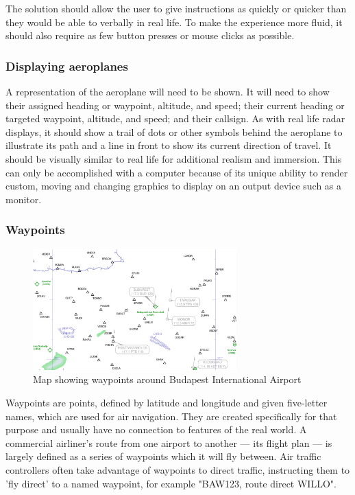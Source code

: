 \documentclass{article}
\begin{document}
The solution should allow the user to give instructions as quickly or quicker than they would be able to verbally in real life.
To make the experience more fluid, it should also require as few button presses or mouse clicks as possible.

\subsubsection{Displaying aeroplanes}
A representation of the aeroplane will need to be shown.
It will need to show their assigned heading or waypoint, altitude, and speed; their current heading or targeted waypoint, altitude, and speed; and their callsign.
As with real life radar displays, it should show a trail of dots or other symbols behind the aeroplane to illustrate its path and a line in front to show its current direction of travel.
It should be visually similar to real life for additional realism and immersion.
This can only be accomplished with a computer because of its unique ability to render custom, moving and changing graphics to display on an output device such as a monitor.

\subsubsection{Waypoints}
\begin{figure}[H]
\centering
\includegraphics[width=0.7\textwidth]{context/budapest.png}
\caption{\label{fig:budapest}Map showing waypoints around Budapest International Airport}
\end{figure}
Waypoints are points, defined by latitude and longitude and given five-letter names, which are used for air navigation.
They are created specifically for that purpose and usually have no connection to features of the real world\cite{waypoint}.
A commercial airliner's route from one airport to another --- its flight plan --- is largely defined as a series of waypoints which it will fly between.
Air traffic controllers often take advantage of waypoints to direct traffic, instructing them to 'fly direct' to a named waypoint, for example "BAW123, route direct WILLO".
\end{document}
